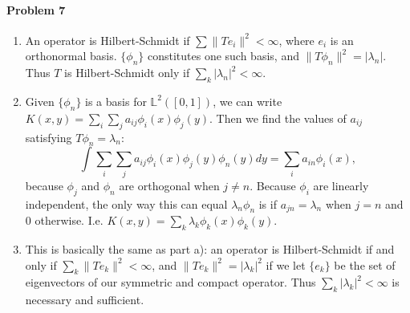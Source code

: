 \documentclass[12pt]{article}
\begin{document}
\paragraph{Problem 7}
\begin{enumerate}[label=\alph*)]
\item An operator is Hilbert-Schmidt if $\sum\|Te_i\|^2 < \infty$, where $e_i$
  is an orthonormal basis. $\{\phi_n\}$ constitutes one such basis, and
  $\|T\phi_n\|^2 = |\lambda_n|$. Thus $T$ is Hilbert-Schmidt only if
  $\sum_k|\lambda_n|^2 < \infty$.
\item Given $\{\phi_n\}$ is a basis for $\mathbb{L}^2([0,1])$, we can write
  $K(x,y) = \sum_i\sum_ja_{ij}\phi_i(x)\phi_j(y)$. Then we find the values of
  $a_{ij}$ satisfying $T\phi_n = \lambda_n$:
  \begin{displaymath}
    \int\sum_i\sum_ja_{ij}\phi_i(x)\phi_j(y)\phi_n(y)dy
    = \sum_ia_{in}\phi_i(x),
  \end{displaymath}
  because $\phi_j$ and $\phi_n$ are orthogonal when $j\neq n$. Because $\phi_i$
  are linearly independent, the only way this can equal $\lambda_n\phi_n$ is if
  $a_{jn} =\lambda_n$ when $j=n$ and 0 otherwise. I.e. $K(x,y) = \sum_k
  \lambda_k\phi_k(x)\phi_k(y)$.
\item This is basically the same as part a): an operator is Hilbert-Schmidt if
  and only if $\sum_k\|Te_k\|^2 < \infty$, and $\|Te_k\|^2 = |\lambda_k|^2$ if
  we let $\{e_k\}$ be the set of eigenvectors of our symmetric and compact
  operator. Thus $\sum_k|\lambda_k|^2 < \infty$ is necessary and sufficient.
  

\end{enumerate}
\end{document}
